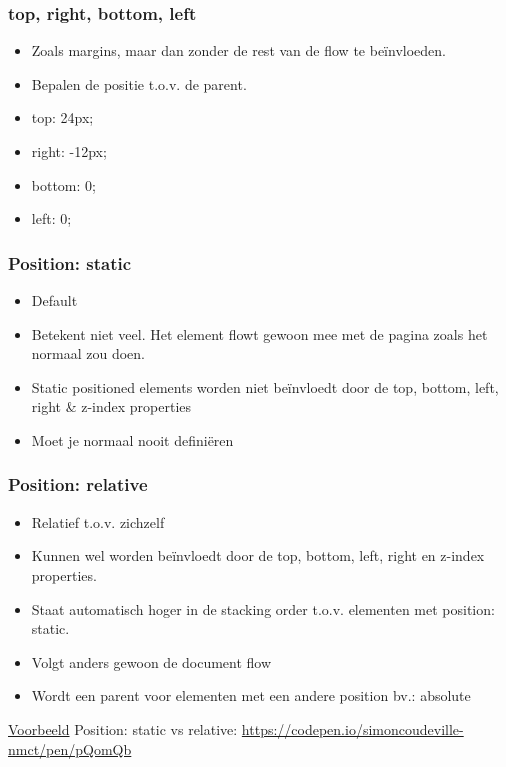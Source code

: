 \documentclass{article}
\begin{document}
\subsubsection{top, right, bottom, left}
\begin{itemize}
    \item Zoals margins, maar dan zonder de rest van de flow te beïnvloeden.
    \item Bepalen de positie t.o.v. de parent.
    \item top: 24px;
    \item right: -12px;
    \item bottom: 0;
    \item left: 0;
\end{itemize}

\subsubsection{Position: static}
\begin{itemize}
    \item Default
    \item Betekent niet veel. Het element flowt gewoon mee met de pagina zoals het normaal zou doen.
    \item Static positioned elements worden niet beïnvloedt door de top, bottom,
    left, right \& z-index properties
    \item Moet je normaal nooit definiëren
\end{itemize}

\subsubsection{Position: relative}

\begin{itemize}
    \item Relatief t.o.v. zichzelf
    \item Kunnen wel worden beïnvloedt door de top, bottom, left, right en z-index properties.
    \item Staat automatisch hoger in de stacking order t.o.v. elementen met position: static.
    \item Volgt anders gewoon de document flow
    \item Wordt een parent voor elementen met een andere position bv.: absolute
\end{itemize}

\underline{Voorbeeld} Position: static vs relative: \url{https://codepen.io/simoncoudeville-nmct/pen/pQomQb}
\end{document}
